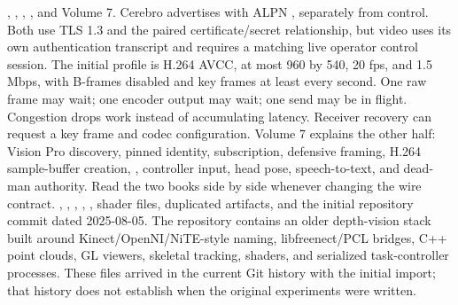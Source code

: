 \markdownRendererInterblockSeparator
{}\markdownRendererBlockQuoteBegin
{} , , , , and Volume 7.\markdownRendererBlockQuoteEnd \markdownRendererInterblockSeparator
{}Cerebro advertises  with ALPN , separately from  control. Both use TLS 1.3 and the paired certificate/secret relationship, but video uses its own authentication transcript and requires a matching live operator control session.\markdownRendererParagraphSeparator
{}The initial profile is H.264 AVCC, at most 960 by 540, 20 fps, and 1.5 Mbps, with B-frames disabled and key frames at least every second. One raw frame may wait; one encoder output may wait; one send may be in flight. Congestion drops work instead of accumulating latency. Receiver recovery can request a key frame and codec configuration.\markdownRendererParagraphSeparator
{}Volume 7 explains the other half: Vision Pro discovery, pinned identity, subscription, defensive framing, H.264 sample-buffer creation, , controller input, head pose, speech-to-text, and dead-man authority. Read the two books side by side whenever changing the wire contract.\markdownRendererInterblockSeparator
{}
\markdownRendererSectionEnd \markdownRendererSectionBegin
{}\markdownRendererInterblockSeparator
{}\markdownRendererBlockQuoteBegin
{} , , , , , shader files, duplicated  artifacts, and the initial repository commit  dated 2025-08-05.\markdownRendererBlockQuoteEnd \markdownRendererInterblockSeparator
{}The repository contains an older depth-vision stack built around Kinect/OpenNI/NiTE-style naming, libfreenect/PCL bridges, C++ point clouds, GL viewers, skeletal tracking, shaders, and serialized task-controller processes. These files arrived in the current Git history with the initial import; that history does not establish when the original experiments were written.\markdownRendererParagraphSeparator
